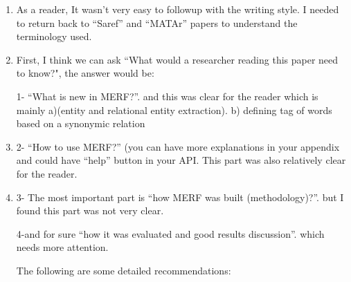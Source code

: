 \begin{enumerate}[leftmargin=0mm,label=\bfseries CommentR3.\arabic*]
\item \label{Review.3.1}
As a reader, It wasn't very easy to followup with the writing 
style. 
I needed to return back to ``Saref'' and ``MATAr'' papers 
to understand the terminology used.



\item \label{Review.3.2}
First, I think we can ask 
``What would a researcher reading this paper need to know?", the answer would be:

1- ``What is new in MERF?''. and this was clear for the reader 
    which is mainly
    a)(entity and relational entity extraction).
    b) defining tag of words based on a synonymic relation


\item \label{Review.3.3}
2- ``How to use MERF?''
(you can have more explanations in your appendix and could have 
``help'' button in your API. This part was also relatively 
clear for the reader.



\item \label{Review.3.4}
3- The most important part is ``how MERF was built 
(methodology)?''. but I found this part was not very clear.


4-and for sure ``how it was evaluated and good results discussion''. 
which needs more attention.


The following are some detailed recommendations:


\end{enumerate}
